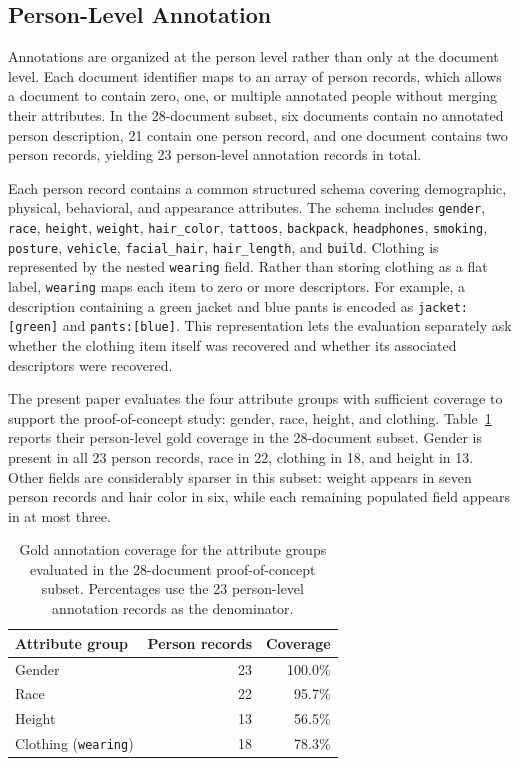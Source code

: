 \documentclass[sigconf,nonacm]{acmart}
\begin{document}
\subsection{Person-Level Annotation}
\label{subsec:dataset-annotation}

Annotations are organized at the person level rather than only at the document
level. Each document identifier maps to an array of person records, which
allows a document to contain zero, one, or multiple annotated people without
merging their attributes. In the 28-document subset, six documents contain no
annotated person description, 21 contain one person record, and one document
contains two person records, yielding 23 person-level annotation records in
total.

Each person record contains a common structured schema covering demographic,
physical, behavioral, and appearance attributes. The schema includes
\texttt{gender}, \texttt{race}, \texttt{height}, \texttt{weight},
\texttt{hair\_color}, \texttt{tattoos}, \texttt{backpack},
\texttt{headphones}, \texttt{smoking}, \texttt{posture}, \texttt{vehicle},
\texttt{facial\_hair}, \texttt{hair\_length}, and \texttt{build}. Clothing is
represented by the nested \texttt{wearing} field. Rather than storing clothing
as a flat label, \texttt{wearing} maps each item to zero or more descriptors.
For example, a description containing a green jacket and blue pants is encoded
as \texttt{jacket:[green]} and \texttt{pants:[blue]}. This representation lets
the evaluation separately ask whether the clothing item itself was recovered
and whether its associated descriptors were recovered.

The present paper evaluates the four attribute groups with sufficient coverage
to support the proof-of-concept study: gender, race, height, and clothing.
Table~\ref{tab:attribute-coverage} reports their person-level gold coverage in
the 28-document subset. Gender is present in all 23 person records, race in 22,
clothing in 18, and height in 13. Other fields are considerably sparser in this
subset: weight appears in seven person records and hair color in six, while
each remaining populated field appears in at most three.

\begin{table}[t]
    \centering
    \caption{Gold annotation coverage for the attribute groups evaluated in the
    28-document proof-of-concept subset. Percentages use the 23 person-level
    annotation records as the denominator.}
    \label{tab:attribute-coverage}
    \begin{tabular}{lrr}
        \toprule
        Attribute group & Person records & Coverage \\
        \midrule
        Gender & 23 & 100.0\% \\
        Race & 22 & 95.7\% \\
        Height & 13 & 56.5\% \\
        Clothing (\texttt{wearing}) & 18 & 78.3\% \\
        \bottomrule
    \end{tabular}
\end{table}
\end{document}
